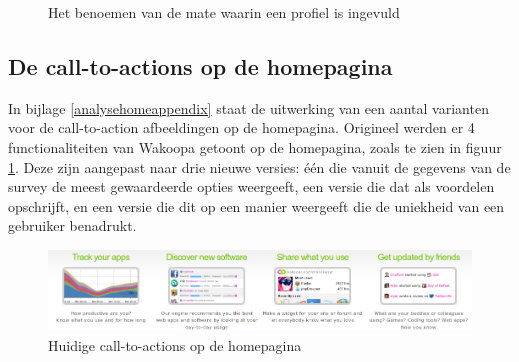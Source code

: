 \documentclass[a4paper, 10pt, pdftex]{report}
\begin{document}
    \begin{figure}
      \caption{Het benoemen van de mate waarin een profiel is ingevuld}
    \end{figure}


    \subsection{De call-to-actions op de homepagina}
      \label{ctahomepagetest}

      In bijlage \ref{analysehomeappendix} staat de uitwerking van een aantal varianten voor de call-to-action afbeeldingen op de homepagina. Origineel werden er 4 functionaliteiten van Wakoopa getoont op de homepagina, zoals te zien in figuur \ref{ctahomeimg}. Deze zijn aangepast naar drie nieuwe versies: \'e\'en die vanuit de gegevens van de survey de meest gewaardeerde opties weergeeft, een versie die dat als voordelen opschrijft, en een versie die dit op een manier weergeeft die de uniekheid van een gebruiker benadrukt.
    \begin{figure}
      \begin{center}
        \includegraphics[width=\textwidth]{../images/newhomepage/original}
        \caption{Huidige call-to-actions op de homepagina}
        \label{ctahomeimg}
      \end{center}
    \end{figure}
\end{document}
